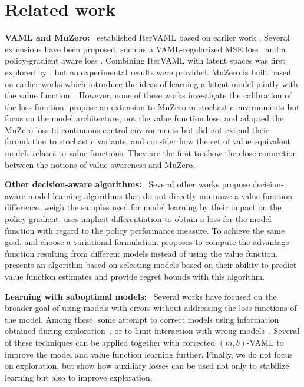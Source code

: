 \section{Related work}

\textbf{VAML and MuZero:}~ \textcite{itervaml} established IterVAML based on earlier work \parencite{vaml}.
Several extensions have been proposed, such as a VAML-regularized MSE loss~\parencite{voelcker2022value} and a policy-gradient aware loss \parencite{abachi2020policy}.
Combining IterVAML with latent spaces was first explored by \textcite{abachi2022viper}, but no experimental results were provided.
MuZero \parencite{schrittwieser2020mastering,ye2021mastering} is built based on earlier works which introduce the ideas of learning a latent model jointly with the value function~\parencite{silver2017predictron,oh2017value}.
However, none of these works investigate the calibration of the loss function.
\textcite{antonoglou2022planning} propose an extension to MuZero in stochastic environments but focus on the model architecture, not the value function loss.
\textcite{hansen2022temporal} and \textcite{hansen2024tdmpc} adapted the MuZero loss to continuous control environments but did not extend their formulation to stochastic variants.
\textcite{grimm2020value} and \textcite{grimm2021proper} consider how the set of value equivalent models relates to value functions. 
They are the first to show the close connection between the notions of value-awareness and MuZero.

\textbf{Other decision-aware algorithms:}~ Several other works propose decision-aware model learning algorithms that do not directly minimize a value function difference.
\textcite{doro2020gradient} weigh the samples used for model learning by their impact on the policy gradient.
\textcite{nikishin2021control} uses implicit differentiation to obtain a loss for the model function with regard to the policy performance measure. 
To achieve the same goal, \textcite{eysenbach2022mismatched} and \textcite{ghugare2023simplifying} choose a variational formulation.
\textcite{modhe2021model} proposes to compute the advantage function resulting from different models instead of using the value function.
\textcite{ayoub2020model} presents an algorithm based on selecting models based on their ability to predict value function estimates and provide regret bounds with this algorithm.

\textbf{Learning with suboptimal models:}~ Several works have focused on the broader goal of using models with errors without addressing the loss functions of the model.
Among these, some attempt to correct models using information obtained during exploration~\parencite{joseph2013reinforcement,talvitie2017self,modi2020sample,rakhsha2022operator,rakhsha2024maximum}, or to limit interaction with wrong models~\parencite{buckman2018sample,janner2019mbpo,pmlr-v119-abbas20a}.
Several of these techniques can be applied together with corrected $(m,b)$-VAML to improve the model and value function learning further.
Finally, we do not focus on exploration, but \textcite{guo2022byolexplore} show how auxiliary losses can be used not only to stabilize learning but also to improve exploration.

